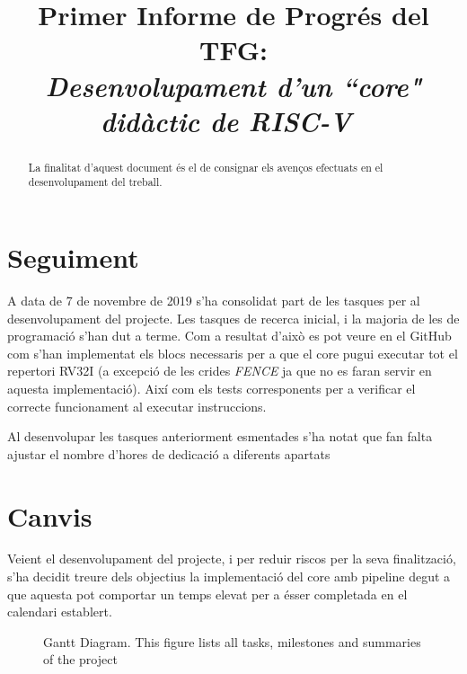 \documentclass[conference,onecolumn, catalan]{IEEEtran}
\title{Primer Informe de Progrés del TFG: \\ \vspace{0.2cm} {\huge \textit{ Desenvolupament d'un ``core" didàctic de RISC-V\ }} }
\author{
\IEEEauthorblockN{Pau Casacuberta Orta}
\IEEEauthorblockA{
\textit{Autonomous University of Barcelona}\\
Cerdanyola del Vallès, Barcelona 08193\\
pau.casacubertao@e-campus.uab.cat\\}}
\begin{document}
\maketitle

\begin{versionhistory}
\end{versionhistory}

\begin{abstract}
La finalitat d'aquest document és el de consignar els avenços efectuats en el desenvolupament del treball.
\end{abstract}

\section{Seguiment}

A data de 7 de novembre de 2019 s'ha consolidat part de les tasques per al desenvolupament del projecte. 
Les tasques de recerca inicial, i la majoria de les de programació s'han dut a terme. Com a resultat d'això es pot veure en el GitHub\cite{casacuberta_orta_4a1c0/rv32i-verilog_2019} com s'han implementat els blocs necessaris per a que el core pugui executar tot el repertori RV32I (a excepció de les crides \textit{FENCE} ja que no es faran servir en aquesta implementació). 
Així com els tests corresponents per a verificar el correcte funcionament al executar instruccions.

Al desenvolupar les tasques anteriorment esmentades s'ha notat que fan falta ajustar el nombre d'hores de dedicació a diferents apartats 

\section{Canvis}

Veient el desenvolupament del projecte, i per reduir riscos per la seva finalització, s'ha decidit treure dels objectius la implementació del core amb pipeline degut a que aquesta pot comportar un temps elevat per a ésser completada en el calendari establert.


\begin{figure}[!ht]
\centering
\caption{Gantt Diagram. This figure lists all tasks, milestones and summaries of the project}
\label{fig:gantt}
\end{figure}
\end{document}

